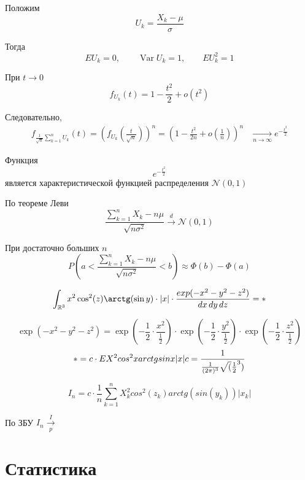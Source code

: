 \documentclass[12pt,a4paper]{article}
\begin{document}
\begin{proofbox}{}

Положим
\[
U_k
=
\frac{X_k-\mu}{\sigma}
\]

Тогда
\[
EU_k=0,
\qquad
\operatorname{Var}U_k=1,
\qquad
EU_k^2=1
\]

При $t\to0$
\[
f_{U_k}(t)
=
1-\frac{t^2}{2}+o(t^2)
\]

Следовательно,
\[
\begin{aligned}
f_{\frac{1}{\sqrt{n}}\sum_{k=1}^nU_k}(t)
=
\left(
f_{U_k}\left(\frac{t}{\sqrt{n}}\right)
\right)^n
=
\left(
1-\frac{t^2}{2n}
+
o\left(\frac{1}{n}\right)
\right)^n
&\xrightarrow[n\to\infty]{}
e^{-\frac{t^2}{2}}
\end{aligned}
\]

Функция
\[
e^{-\frac{t^2}{2}}
\]
является характеристической функцией распределения $\mathcal{N}(0,1)$

По теореме Леви
\[
\frac{\sum_{k=1}^nX_k-n\mu}
{\sqrt{n\sigma^2}}
\xrightarrow{d}
\mathcal{N}(0,1)
\]

\end{proofbox}

\begin{corollary}

При достаточно больших $n$
\[
P\left(
a<
\frac{\sum_{k=1}^nX_k-n\mu}
{\sqrt{n\sigma^2}}
<b
\right)
\approx
\Phi(b)-\Phi(a)
\]

\end{corollary}

\begin{example}

\[
\int_{\mathbb{R}^3} x^2 \cos^2(z) \arctg(\sin y) \cdot |x| \cdot \frac{exp(-x^2-y^2-z^2)}{dx\,dy\,dz} = *
\]

\[
\exp(-x^2-y^2-z^2) = \exp(-\frac{1}{2} \cdot \frac{x^2}{\frac{1}{2}}) \cdot \exp(-\frac{1}{2} \cdot \frac{y^2}{\frac{1}{2}}) \cdot \exp(-\frac{1}{2} \cdot \frac{z^2}{\frac{1}{2}}) 
\]
 \[
* = c \cdot EX^2 cos^2 x arctg sin x |x|
\\
c = \frac{1}{\frac{1}{(2\pi)^3}\sqrt(\frac{1}{2}^3)}
\]

\[
I_n = c \cdot \frac{1}{n} \sum^n_{k=1} X_k^2 cos^2(z_k)arctg(sin(y_k)) |x_k|
\]

По ЗБУ $I_n \xrightarrow[p] I$

\end{example}

\newpage

\section{Статистика}
\end{document}
